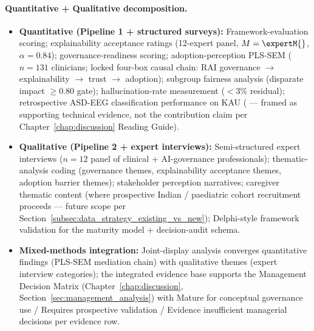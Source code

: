 \paragraph{Quantitative + Qualitative decomposition.}
\begin{itemize}[leftmargin=*, itemsep=3pt]
    \item \textbf{Quantitative (Pipeline 1 + structured surveys):} Framework-evaluation scoring; explainability acceptance ratings (12-expert panel, $M = \expertM{}$, $\alpha = 0.84$); governance-readiness scoring; adoption-perception PLS-SEM ($n = 131$ clinicians; locked four-box causal chain: RAI governance $\to$ explainability $\to$ trust $\to$ adoption); subgroup fairness analysis (disparate impact $\geq 0.80$ gate); hallucination-rate measurement ($< 3$\% residual); retrospective ASD-EEG classification performance on KAU (\asdacc{} --- framed as supporting technical evidence, not the contribution claim per Chapter~\ref{chap:discussion} Reading Guide).
    \item \textbf{Qualitative (Pipeline 2 + expert interviews):} Semi-structured expert interviews ($n = 12$ panel of clinical + AI-governance professionals); thematic-analysis coding (governance themes, explainability acceptance themes, adoption barrier themes); stakeholder perception narratives; caregiver thematic content (where prospective Indian / paediatric cohort recruitment proceeds --- future scope per Section~\ref{subsec:data_strategy_existing_vs_new}); Delphi-style framework validation for the maturity model + decision-audit schema.
    \item \textbf{Mixed-methods integration:} Joint-display analysis converges quantitative findings (PLS-SEM mediation chain) with qualitative themes (expert interview categories); the integrated evidence base supports the Management Decision Matrix (Chapter~\ref{chap:discussion}, Section~\ref{sec:management_analysis}) with Mature for conceptual governance use / Requires prospective validation / Evidence insufficient managerial decisions per evidence row.
\end{itemize}

